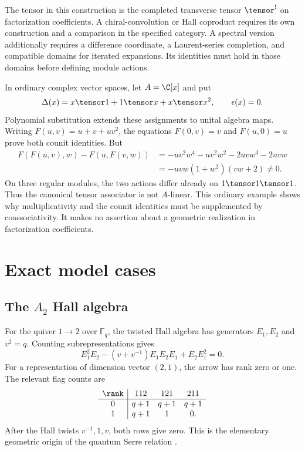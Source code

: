 The tensor in this construction is the completed transverse tensor
$\tensor^!$ on factorization coefficients.
A chiral-convolution or Hall coproduct requires its own construction
and a comparison in the specified category.
A spectral version additionally requires a difference coordinate,
a Laurent-series completion, and compatible domains for iterated expansions.
Its identities must hold in those domains before defining module actions.

\begin{example}
In ordinary complex vector spaces, let $A=\C[x]$ and put
\[
 \Delta(x)=x\tensor1+1\tensor x+x\tensor x^2,
 \qquad \epsilon(x)=0.
\]
Polynomial substitution extends these assignments to unital algebra maps.
Writing $F(u,v)=u+v+uv^2$, the equations
$F(0,v)=v$ and $F(u,0)=u$ prove both counit identities.
But
\[
\begin{split}
 F(F(u,v),w)-F(u,F(v,w))
 &=-uv^2w^4-uv^2w^2-2uvw^3-2uvw\\
 &=-uvw(1+w^2)(vw+2)\ne0.
\end{split}
\]
On three regular modules, the two actions differ already on
$1\tensor1\tensor1$.
Thus the canonical tensor associator is not $A$-linear.
This ordinary example shows why multiplicativity and the counit identities
must be supplemented by coassociativity.
It makes no assertion about a geometric realization in factorization coefficients.
\end{example}

\part{Exact model cases}

\chapter{The \texorpdfstring{$A_2$}{A2} Hall algebra}
For the quiver $1\to2$ over $\mathbb F_q$, the twisted Hall algebra has generators $E_1,E_2$ and $v^2=q$. Counting subrepresentations gives
\[
 E_1^2E_2-(v+v^{-1})E_1E_2E_1+E_2E_1^2=0.
\]
For a representation of dimension vector $(2,1)$, the arrow has rank zero or one. The relevant flag counts are
\[
\begin{array}{c|ccc}
\rank&112&121&211\\ \hline
0&q+1&q+1&q+1\\
1&q+1&1&0.
\end{array}
\]
After the Hall twists $v^{-1},1,v$, both rows give zero. This is the elementary geometric origin of the quantum Serre relation \cite{Ringel,Green}.

